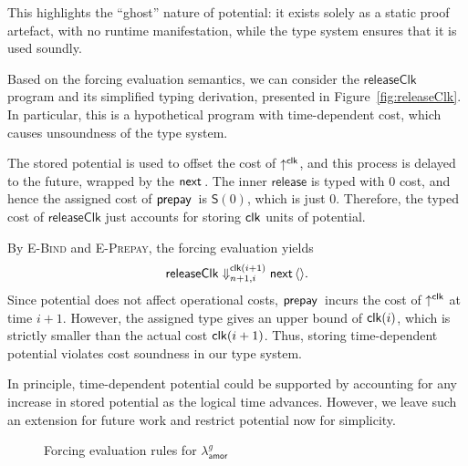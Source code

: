 This highlights the ``ghost'' nature of potential: it exists solely as a static proof artefact, 
with no runtime manifestation, while the type system ensures that it is used soundly.

Based on the forcing evaluation semantics, we can consider 
the $\mathsf{releaseClk}$ program and its simplified typing derivation, presented in Figure~\ref{fig:releaseClk}.
In particular, this is a hypothetical program with time-dependent cost, which causes unsoundness of the type system.

The stored potential is used to offset the cost of $\uparrow^{\mathsf{clk}}$, and this process is delayed to the future, wrapped by the $\mathsf{next}\,$.
The inner $\mathsf{release}$ is typed with $0$ cost, and hence the assigned cost of $\mathsf{prepay}\,$ is $\mathsf{S}(0)$, which is just $0$.
Therefore, the typed cost of $\mathsf{releaseClk}$ just accounts for storing $\mathsf{clk}$ units of potential.

By \textsc{E-Bind} and \textsc{E-Prepay}, the forcing evaluation yields
\[
\mathsf{releaseClk} \Downarrow^{\mathsf{clk}(i+1)}_{n+1,i} \mathsf{next}\,\langle\rangle.
\]
Since potential does not affect operational costs, 
$\mathsf{prepay}\,$ incurs the cost of $\uparrow^{\mathsf{clk}}$ at time $i+1$. 
However, the assigned type gives an upper bound of $\mathsf{clk}(i)$, which is strictly smaller than the actual cost $\mathsf{clk}(i+1)$. Thus, storing time-dependent potential violates cost soundness in our type system.

In principle, time-dependent potential could be supported by accounting for any increase in stored potential as the logical time advances. 
However, we leave such an extension for future work and restrict potential now for simplicity.

\begin{figure}[H]
  \small
\caption{Forcing evaluation rules for $\lambda^g_{\mathsf{amor}}$}
\label{fig:amor-forcing}
\end{figure}


